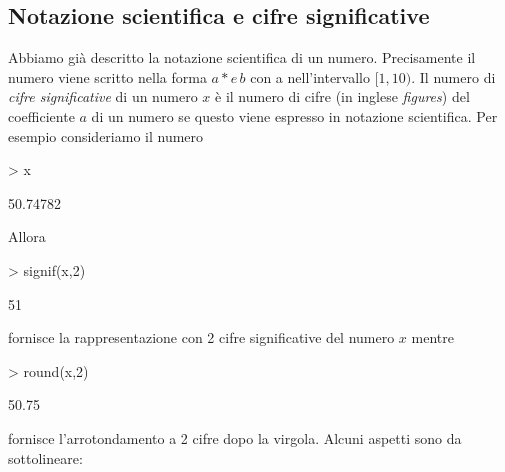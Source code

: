 \documentclass[onecolumn,11pt]{book}
\begin{document}
\subsection{Notazione scientifica e cifre significative}
Abbiamo gi\`a descritto la notazione scientifica di un numero.  Precisamente  il numero viene scritto nella forma $a*e \,b$ con a nell'intervallo $[1,10)$.
Il numero di \emph{cifre significative}  di un numero $x$ \`e  il numero di cifre (in inglese \emph{figures}) del coefficiente $a$ di un  numero se questo viene espresso in notazione scientifica.
Per esempio consideriamo il numero
\begin{Schunk}
\begin{Sinput}
> x
\end{Sinput}
\begin{Soutput}
[1] 50.74782
\end{Soutput}
\end{Schunk}
Allora
\begin{Schunk}
\begin{Sinput}
> signif(x,2)
\end{Sinput}
\begin{Soutput}
[1] 51
\end{Soutput}
\end{Schunk}
fornisce la rappresentazione con 2 cifre significative del numero $x$ mentre
\begin{Schunk}
\begin{Sinput}
> round(x,2)
\end{Sinput}
\begin{Soutput}
[1] 50.75
\end{Soutput}
\end{Schunk}
fornisce l'arrotondamento a 2 cifre dopo la virgola. Alcuni aspetti sono da sottolineare:
\end{document}
